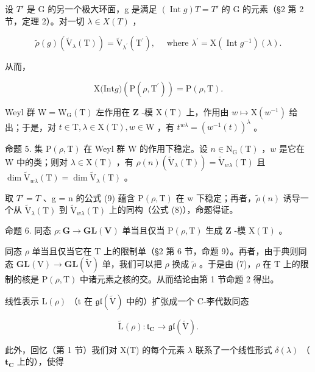 设 \(T'\) 是 G 的另一个极大环面，g 是满足 \((\operatorname{Int} g)T = T'\) 的 G 的元素（§2 第 2 节，定理 2）。对一切 \(\lambda \in X(T)\) ，

\[
\tilde {\rho} (g) (\tilde {\mathrm{V}} _ {\lambda} (\mathrm{T})) = \tilde {\mathrm{V}} _ {\lambda^ {\prime}} (\mathrm{T} ^ {\prime}), \quad \text { where } \lambda^ {\prime} = \mathrm{X} (\operatorname{Int} g ^ {- 1}) (\lambda).\tag{8}
\]

从而，

\[
\mathrm{X(Int} g) (\mathrm{P} (\rho , \mathrm{T} ^ {\prime})) = \mathrm{P} (\rho , \mathrm{T}).\tag{9}
\]

Weyl 群 \(\mathrm{W} = \mathrm{W}_{\mathrm{G}}(\mathrm{T})\) 左作用在 \(\mathbf{Z}\) -模 \(\mathrm{X(T)}\) 上，作用由 \(w\mapsto \mathrm{X}(w^{-1})\) 给出；于是，对 \(t\in \mathrm{T},\lambda \in \mathrm{X(T)},w\in \mathrm{W}\) ，有 \(t^{w\lambda} = (w^{-1}(t))^{\lambda}\) 。

命题 5. 集 \(\mathrm{P}(\rho, \mathrm{T})\) 在 Weyl 群 W 的作用下稳定。设 \(n \in \mathrm{N}_{\mathrm{G}}(\mathrm{T})\) ，\(w\) 是它在 W 中的类；则对 \(\lambda \in \mathrm{X}(\mathrm{T})\) ，有 \(\rho(n)(\tilde{\mathrm{V}}_{\lambda}(\mathrm{T})) = \tilde{\mathrm{V}}_{w\lambda}(\mathrm{T})\) 且 \(\dim \tilde{\mathrm{V}}_{w\lambda}(\mathrm{T}) = \dim \tilde{\mathrm{V}}_{\lambda}(\mathrm{T})\) 。

取 \(T' = T\) 、g = n 的公式 (9) 蕴含 \(\mathrm{P}(\rho, \mathrm{T})\) 在 w 下稳定；再者，\(\tilde{\rho}(n)\) 诱导一个从 \(\tilde{\mathrm{V}}_{\lambda}(\mathrm{T})\) 到 \(\tilde{\mathrm{V}}_{w\lambda}(\mathrm{T})\) 上的同构（公式 (8)），命题得证。

命题 6. 同态 \(\rho : \mathbf{G} \to \mathbf{GL}(\mathbf{V})\) 单当且仅当 \(\mathrm{P}(\rho, \mathrm{T})\) 生成 \(\mathbf{Z}\) -模 \(\mathrm{X}(\mathrm{T})\) 。

同态 \(\rho\) 单当且仅当它在 T 上的限制单（§2 第 6 节，命题 9）。再者，由于典则同态 \(\mathbf{GL}(\mathrm{V}) \to \mathbf{GL}(\tilde{\mathrm{V}})\) 单，我们可以把 \(\rho\) 换成 \(\tilde{\rho}\) 。于是由 (7)，\(\rho\) 在 T 上的限制的核是 \(\mathrm{P}(\rho, \mathrm{T})\) 中诸元素之核的交。从而结论由第 1 节命题 2 得出。

线性表示 \(\mathrm{L}(\rho)\) （t 在 \(\mathfrak{gl}(\tilde{\mathrm{V}})\) 中的）扩张成一个 C-李代数同态

\[
\tilde {\mathrm{L}} (\rho): \mathfrak {t} _ {\mathbf {C}} \to \mathfrak {g l} (\tilde {\mathrm{V}}).
\]

此外，回忆（第 1 节）我们对 X(T) 的每个元素 \(\lambda\) 联系了一个线性形式 \(\delta (\lambda)\) （\(\mathbf{t}_{\mathbf{C}}\) 上的），使得

